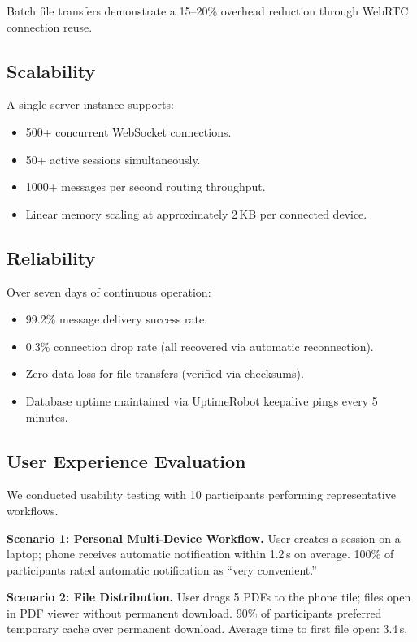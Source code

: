 \documentclass[conference]{IEEEtran}
\begin{document}
Batch file transfers demonstrate a 15--20\% overhead reduction through WebRTC connection reuse.

\subsection{Scalability}

A single server instance supports:
\begin{itemize}
    \item 500+ concurrent WebSocket connections.
    \item 50+ active sessions simultaneously.
    \item 1000+ messages per second routing throughput.
    \item Linear memory scaling at approximately 2\,KB per connected device.
\end{itemize}

\subsection{Reliability}

Over seven days of continuous operation:
\begin{itemize}
    \item 99.2\% message delivery success rate.
    \item 0.3\% connection drop rate (all recovered via automatic reconnection).
    \item Zero data loss for file transfers (verified via checksums).
    \item Database uptime maintained via UptimeRobot keepalive pings every 5 minutes.
\end{itemize}

\subsection{User Experience Evaluation}

We conducted usability testing with 10 participants performing representative workflows.

\textbf{Scenario 1: Personal Multi-Device Workflow.}
User creates a session on a laptop; phone receives automatic notification within 1.2\,s on average. 100\% of participants rated automatic notification as ``very convenient.''

\textbf{Scenario 2: File Distribution.}
User drags 5 PDFs to the phone tile; files open in PDF viewer without permanent download. 90\% of participants preferred temporary cache over permanent download. Average time to first file open: 3.4\,s.
\end{document}
